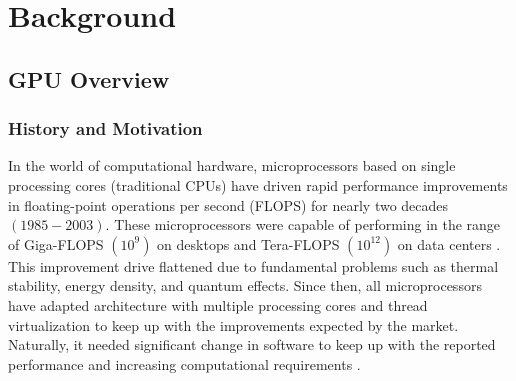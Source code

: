 \chapter{Background}\label{chap:Background}


\section{GPU Overview}\label{GPU-info}
\subsection{History and Motivation}\label{sec:History}
In the world of computational hardware, microprocessors based on single processing cores (traditional CPUs) have driven rapid performance improvements in floating-point operations per second (FLOPS) for nearly two decades $(1985-2003)$.
These microprocessors were capable of performing in the range of Giga-FLOPS $(10^9)$ on desktops and Tera-FLOPS $(10^{12})$ on data centers \cite{GPU_book_wen-mei}.
This improvement drive flattened due to fundamental problems such as thermal stability, energy density, and quantum effects.
Since then, all microprocessors have adapted architecture with multiple processing cores and thread virtualization to keep up with the improvements expected by the market. Naturally, it needed significant change in software to keep up with the reported performance and increasing computational requirements \cite{Sutter-multi-core-programming}.

